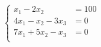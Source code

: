 \begin {align}[] \left \{ \begin {aligned} x_1 - 2 x_2 \phantom {+ 0 x_3} &= 100\\ 4 x_1 - x_2 - 3 x_3 &= 0\\ 7 x_1 + 5 x_2 - x_3 &= 0\\ \end {aligned}\right . \end {align}
